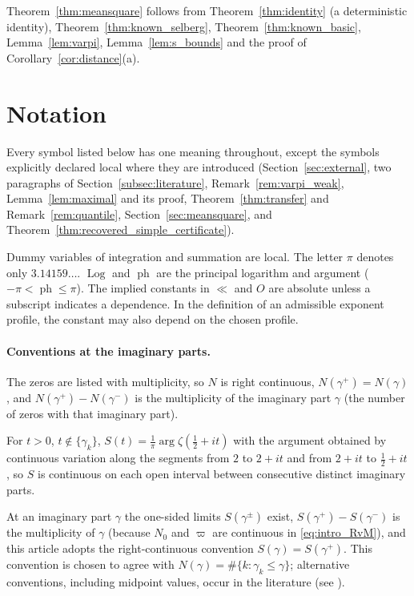 \documentclass[11pt,a4paper]{article}
\makeatletter
\numberwithin{equation}{section}
\DeclareRobustCommand{\CGref}[1]{\ref{#1}}
\DeclareRobustCommand{\CGeqref}[1]{\eqref{#1}}
\DeclareRobustCommand{\CGcite}[2][]{\if\relax\detokenize{#1}\relax\cite{#2}\else\cite[#1]{#2}\fi}
\let\CG@origref\ref
\let\CG@origeqref\eqref
\newcommand{\CG@gettip}[1]{\@ifundefined{CGTip@#1}{#1}{\csname CGTip@#1\endcsname}}
\newcommand{\CG@getbib}[1]{\@ifundefined{CGBib@#1}{#1}{\csname CGBib@#1\endcsname}}
\DeclareRobustCommand{\CGref}[1]{\pdftooltip{\CG@origref{#1}}{\CG@gettip{#1}}}
\DeclareRobustCommand{\CGeqref}[1]{\pdftooltip{\CG@origeqref{#1}}{\CG@gettip{#1}}}
\DeclareRobustCommand{\CGcite}[2][]{\pdftooltip{\if\relax\detokenize{#1}\relax\cite{#2}\else\cite[#1]{#2}\fi}{\CG@getbib{#2}}}
\theoremstyle{definition}
\theoremstyle{remark}
\newcommand{\Nz}{N_0} %
\makeatother
\begin{document}
Theorem~\CGref{thm:meansquare} follows from Theorem~\CGref{thm:identity} (a deterministic identity), Theorem~\CGref{thm:known_selberg}, Theorem~\CGref{thm:known_basic}, Lemma~\CGref{lem:varpi}, Lemma~\CGref{lem:s_bounds} and the proof of Corollary~\CGref{cor:distance}(a).

\section{Notation}\label{sec:notation}

Every symbol listed below has one meaning throughout, except the symbols explicitly declared local where they are introduced (Section~\CGref{sec:external}, two paragraphs of Section~\CGref{subsec:literature}, Remark~\CGref{rem:varpi_weak}, Lemma~\CGref{lem:maximal} and its proof, Theorem~\CGref{thm:transfer} and Remark~\CGref{rem:quantile}, Section~\CGref{sec:meansquare}, and Theorem~\CGref{thm:recovered_simple_certificate}).

Dummy variables of integration and summation are local. The letter $\pi$ denotes only $3.14159\ldots$. $\operatorname{Log}$ and $\operatorname{ph}$ are the principal logarithm and argument ($-\pi<\operatorname{ph}\le\pi$). The implied constants in $\ll$ and $O$ are absolute unless a subscript indicates a dependence. In the definition of an admissible exponent profile, the constant may also depend on the chosen profile.

\paragraph{Conventions at the imaginary parts.}
The zeros are listed with multiplicity, so $N$ is right continuous, $N(\gamma^+)=N(\gamma)$, and $N(\gamma^+)-N(\gamma^-)$ is the multiplicity of the imaginary part $\gamma$ (the number of zeros with that imaginary part).

For $t>0$, $t\notin\{\gamma_k\}$, $S(t)=\frac1\pi\arg\zeta(\frac12+it)$ with the argument obtained by continuous variation along the segments from $2$ to $2+it$ and from $2+it$ to $\frac12+it$, so $S$ is continuous on each open interval between consecutive distinct imaginary parts.

At an imaginary part $\gamma$ the one-sided limits $S(\gamma^\pm)$ exist, $S(\gamma^+)-S(\gamma^-)$ is the multiplicity of $\gamma$ (because $\Nz$ and $\varpi$ are continuous in \CGeqref{eq:intro_RvM}), and this article adopts the right-continuous convention $S(\gamma)=S(\gamma^+)$. This convention is chosen to agree with $N(\gamma)=\#\{k:\gamma_k\le\gamma\}$; alternative conventions, including midpoint values, occur in the literature (see \CGcite[\S9.3]{Titchmarsh1986}).
\end{document}
